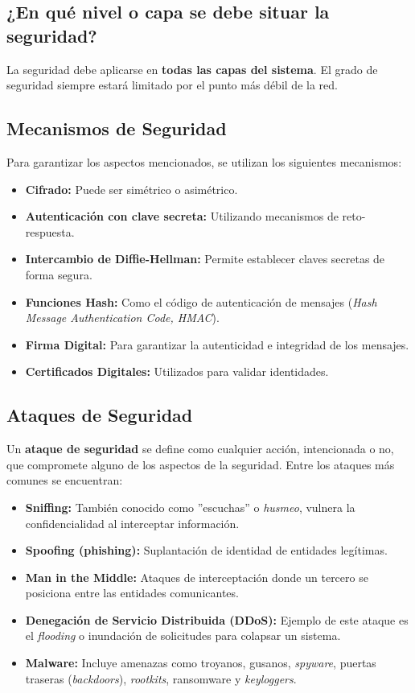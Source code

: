 \documentclass[a4paper,12pt]{article}
\begin{document}
\subsection{¿En qué nivel o capa se debe situar la seguridad?}

La seguridad debe aplicarse en \textbf{todas las capas del sistema}. El grado de seguridad siempre estará limitado por el punto más débil de la red.

\subsection{Mecanismos de Seguridad}

Para garantizar los aspectos mencionados, se utilizan los siguientes mecanismos:

\begin{itemize}
    \item \textbf{Cifrado:} Puede ser simétrico o asimétrico.
    \item \textbf{Autenticación con clave secreta:} Utilizando mecanismos de reto-respuesta.
    \item \textbf{Intercambio de Diffie-Hellman:} Permite establecer claves secretas de forma segura.
    \item \textbf{Funciones Hash:} Como el código de autenticación de mensajes (\textit{Hash Message Authentication Code, HMAC}).
    \item \textbf{Firma Digital:} Para garantizar la autenticidad e integridad de los mensajes.
    \item \textbf{Certificados Digitales:} Utilizados para validar identidades.
\end{itemize}

\subsection{Ataques de Seguridad}

Un \textbf{ataque de seguridad} se define como cualquier acción, intencionada o no, que compromete alguno de los aspectos de la seguridad. Entre los ataques más comunes se encuentran:

\begin{itemize}
    \item \textbf{Sniffing:} También conocido como ''escuchas'' o \textit{husmeo}, vulnera la confidencialidad al interceptar información.
    \item \textbf{Spoofing (phishing):} Suplantación de identidad de entidades legítimas.
    \item \textbf{Man in the Middle:} Ataques de interceptación donde un tercero se posiciona entre las entidades comunicantes.
    \item \textbf{Denegación de Servicio Distribuida (DDoS):} Ejemplo de este ataque es el \textit{flooding} o inundación de solicitudes para colapsar un sistema.
    \item \textbf{Malware:} Incluye amenazas como troyanos, gusanos, \textit{spyware}, puertas traseras (\textit{backdoors}), \textit{rootkits}, ransomware y \textit{keyloggers}.
\end{itemize}
\end{document}
